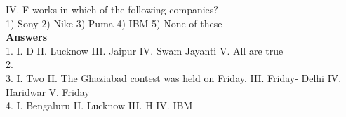 \documentclass[
]{article}
\begin{document}
IV. F works in which of the following companies?\\
1) Sony \hspace{2mm}2) Nike \hspace{2mm}3) Puma \hspace{2mm}4) IBM \hspace{2mm}5) None of these\\

\textbf{Answers}\\

1. I. D \hspace{2mm}II. Lucknow \hspace{2mm}III. Jaipur \hspace{2mm}IV. Swam Jayanti \hspace{2mm}V. All are true\\
2.\\
3. I. Two \hspace{2mm}II. The Ghaziabad contest was held on Friday. \hspace{2mm}III. Friday- Delhi \hspace{2mm}IV. Haridwar \hspace{2mm}V. Friday\\
4. I. Bengaluru \hspace{2mm}II. Lucknow \hspace{2mm}III. H \hspace{2mm}IV. IBM\\
\end{document}
